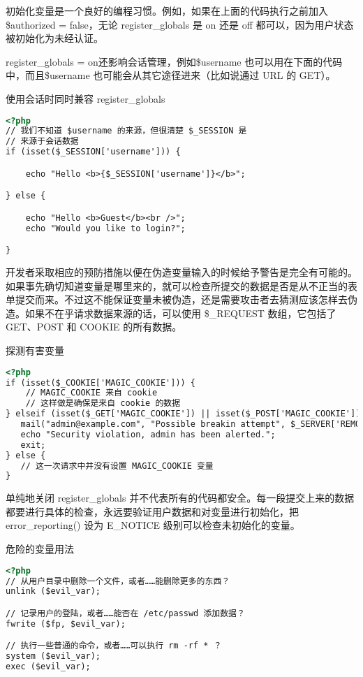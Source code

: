 初始化变量是一个良好的编程习惯。例如，如果在上面的代码执行之前加入 \$authorized = false，无论 register\_globals 是 on 还是 off 都可以，因为用户状态被初始化为未经认证。

register\_globals = on还影响会话管理，例如\$username 也可以用在下面的代码中，而且\$username 也可能会从其它途径进来（比如说通过 URL 的 GET）。

\begin{example}
使用会话时同时兼容 register\_globals
\begin{lstlisting}[language=HTML]
<?php
// 我们不知道 $username 的来源，但很清楚 $_SESSION 是
// 来源于会话数据
if (isset($_SESSION['username'])) {

    echo "Hello <b>{$_SESSION['username']}</b>";

} else {

    echo "Hello <b>Guest</b><br />";
    echo "Would you like to login?";

}
\end{lstlisting}
\end{example}



开发者采取相应的预防措施以便在伪造变量输入的时候给予警告是完全有可能的。如果事先确切知道变量是哪里来的，就可以检查所提交的数据是否是从不正当的表单提交而来。不过这不能保证变量未被伪造，还是需要攻击者去猜测应该怎样去伪造。如果不在乎请求数据来源的话，可以使用 \$\_REQUEST 数组，它包括了 GET、POST 和 COOKIE 的所有数据。



\begin{example}
探测有害变量
\begin{lstlisting}[language=HTML]
<?php
if (isset($_COOKIE['MAGIC_COOKIE'])) {
    // MAGIC_COOKIE 来自 cookie
    // 这样做是确保是来自 cookie 的数据
} elseif (isset($_GET['MAGIC_COOKIE']) || isset($_POST['MAGIC_COOKIE'])) {
   mail("admin@example.com", "Possible breakin attempt", $_SERVER['REMOTE_ADDR']);
   echo "Security violation, admin has been alerted.";
   exit;
} else {
   // 这一次请求中并没有设置 MAGIC_COOKIE 变量
}
\end{lstlisting}
\end{example}


单纯地关闭 register\_globals 并不代表所有的代码都安全。每一段提交上来的数据都要进行具体的检查，永远要验证用户数据和对变量进行初始化，把 error\_reporting() 设为 E\_NOTICE 级别可以检查未初始化的变量。




\begin{example}
危险的变量用法
\begin{lstlisting}[language=HTML]
<?php
// 从用户目录中删除一个文件，或者……能删除更多的东西？
unlink ($evil_var);

// 记录用户的登陆，或者……能否在 /etc/passwd 添加数据？
fwrite ($fp, $evil_var);

// 执行一些普通的命令，或者……可以执行 rm -rf * ？
system ($evil_var);
exec ($evil_var);
\end{lstlisting}
\end{example}

